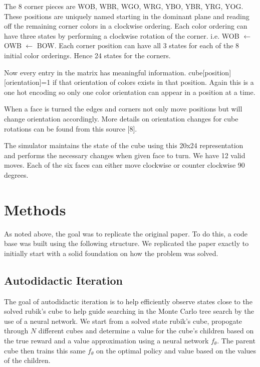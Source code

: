 \documentclass[10pt,twocolumn,letterpaper]{article}
\begin{document}
The 8 corner pieces are WOB, WBR, WGO, WRG, YBO, YBR, YRG, YOG.  These positions are uniquely named starting in the dominant plane and reading off the remaining corner colors in a clockwise ordering.  Each color ordering can have three states by performing a clockwise rotation of the corner.  i.e. WOB $\leftarrow$ OWB $\leftarrow$ BOW.  Each corner position can have all 3 states for each of the 8 initial color orderings.  Hence 24 states for the corners. 

Now every entry in the matrix has meaningful information.  cube[position][orientation]=1 if that orientation of colors exists in that position.  Again this is a one hot encoding so only one color orientation can appear in a position at a time. 

When a face is turned the edges and corners not only move positions but will change orientation accordingly.   More details on orientation changes for cube rotations can be found from this source [8].

The simulator maintains the state of the cube using this 20x24 representation and performs the necessary changes when given face to turn.  We have 12 valid moves.  Each of the six faces can either move clockwise or counter clockwise 90 degrees. 


\section{Methods}
As noted above, the goal was to replicate the original paper. To do this, a code base was built using the following structure. We replicated the paper exactly to initially start with a solid foundation on how the problem was solved.

\subsection{Autodidactic Iteration}
The goal of autodidactic iteration is to help efficiently observe states close to the solved rubik's cube to help guide searching in the Monte Carlo tree search by the use of a neural network. We start from a solved state rubik's cube, propogate through $N$ different cubes and determine a value for the cube's children based on the true reward and a value approximation using a neural network $f_\theta$.  The parent cube then trains this same $f_\theta$ on the optimal policy and value based on the values of the children. 
\\
\end{document}
